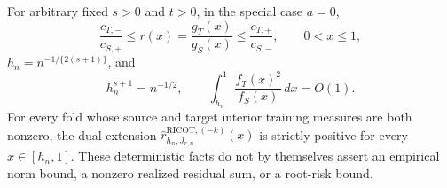 For arbitrary fixed \(s>0\) and \(t>0\), in the special case \(a=0\),
\[
\frac{c_{T,-}}{c_{S,+}}\le r(x)=\frac{g_T(x)}{g_S(x)}\le\frac{c_{T,+}}{c_{S,-}},\qquad 0<x\le1,
\]
\(h_n=n^{-1/\{2(s+1)\}}\), and
\[
h_n^{s+1}=n^{-1/2},\qquad \int_{h_n}^1\frac{f_T(x)^2}{f_S(x)}\,dx=O(1).
\]
For every fold whose source and target interior training measures are both nonzero, the dual extension \(\widehat r^{\mathrm{RICOT},(-k)}_{h_n,J_{r,n}}(x)\) is strictly positive for every \(x\in[h_n,1]\). These deterministic facts do not by themselves assert an empirical norm bound, a nonzero realized residual sum, or a root-risk bound.